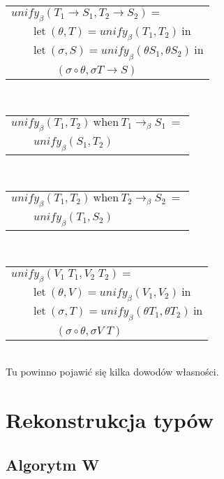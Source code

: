 \documentclass[11pt,leqno]{article}
\begin{document}
\begin{tabular}{l}
$unify_\beta(T_1 \rightarrow S_1, T_2 \rightarrow S_2) = $ \\
$\qquad \textrm{let} \ (\theta, T) = unify_\beta(T_1, T_2) \ \textrm{in} $ \\
$\qquad \textrm{let} \ (\sigma, S) = unify_\beta(\theta S_1, \theta S_2) \ \textrm{in} $ \\
$\qquad\qquad (\sigma \circ \theta, \sigma T \rightarrow S) $ \\
\end{tabular} \\
\begin{tabular}{l}
$unify_\beta(T_1, T_2) \ \textrm{when} \ T_1 \longrightarrow_\beta S_1 \ = $ \\
$\qquad unify_\beta(S_1, T_2)$ \\
\end{tabular} \\
\begin{tabular}{l}
$unify_\beta(T_1, T_2) \ \textrm{when} \ T_2 \longrightarrow_\beta S_2 \ = $ \\
$\qquad unify_\beta(T_1, S_2)$ \\
\end{tabular} \\
\begin{tabular}{l}
$unify_\beta(V_1 \; T_1, V_2 \; T_2) = $ \\
$\qquad \textrm{let} \ (\theta, V) = unify_\beta(V_1, V_2) \ \textrm{in} $ \\
$\qquad \textrm{let} \ (\sigma, T) = unify_\beta(\theta T_1, \theta T_2) \ \textrm{in} $ \\
$\qquad\qquad (\sigma \circ \theta, \sigma V \; T) $ \\
\end{tabular} \\

Tu powinno pojawić się kilka dowodów własności.

\section{Rekonstrukcja typów}

\subsection{Algorytm W}
\end{document}
